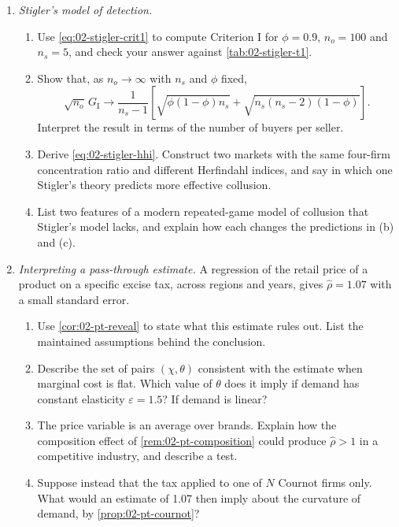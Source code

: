 \begin{enumerate}[label=\arabic*., leftmargin=*, itemsep=6pt]
\item \textit{Stigler's model of detection.}
\begin{enumerate}[label=(\alph*)]
  \item Use \eqref{eq:02-stigler-crit1} to compute Criterion I for $\phi = 0.9$, $n_o = 100$ and $n_s = 5$, and check
  your answer against \cref{tab:02-stigler-t1}.
  \item Show that, as $n_o \to \infty$ with $n_s$ and $\phi$ fixed,
  \[
    \sqrt{n_o}\,G_{\mathrm{I}} \to \frac{1}{n_s - 1}\left[\sqrt{\phi(1 - \phi)n_s} + \sqrt{n_s(n_s - 2)(1 - \phi)}\right].
  \]
  Interpret the result in terms of the number of buyers per seller.
  \item Derive \eqref{eq:02-stigler-hhi}. Construct two markets with the same four-firm concentration ratio and
  different Herfindahl indices, and say in which one Stigler's theory predicts more effective collusion.
  \item List two features of a modern repeated-game model of collusion that Stigler's model lacks, and explain how
  each changes the predictions in (b) and (c).
\end{enumerate}

\item \textit{Interpreting a pass-through estimate.} A regression of the retail price of a product on a specific
excise tax, across regions and years, gives $\hat\rho = 1.07$ with a small standard error.
\begin{enumerate}[label=(\alph*)]
  \item Use \cref{cor:02-pt-reveal} to state what this estimate rules out. List the maintained assumptions behind the
  conclusion.
  \item Describe the set of pairs $(\chi, \theta)$ consistent with the estimate when marginal cost is flat. Which
  value of $\theta$ does it imply if demand has constant elasticity $\varepsilon = 1.5$? If demand is linear?
  \item The price variable is an average over brands. Explain how the composition effect of
  \cref{rem:02-pt-composition} could produce $\hat\rho > 1$ in a competitive industry, and describe a test.
  \item Suppose instead that the tax applied to one of $N$ Cournot firms only. What would an estimate of 1.07 then
  imply about the curvature of demand, by \cref{prop:02-pt-cournot}?
\end{enumerate}

\end{enumerate}
